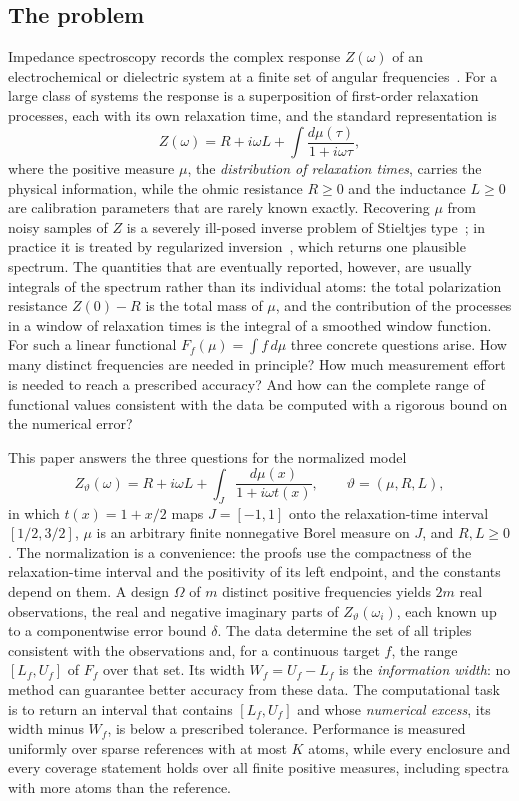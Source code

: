 \documentclass[10pt]{amsart}
\theoremstyle{definition}
\theoremstyle{remark}
\theoremstyle{plain}
\newcommand{\dd}{\,d}
\begin{document}
\subsection{The problem}
Impedance spectroscopy records the complex response $Z(\omega)$ of an electrochemical or dielectric system at a finite set of angular frequencies~\cite{orazem}. For a large class of systems the response is a superposition of first-order relaxation processes, each with its own relaxation time, and the standard representation is
\[
 Z(\omega)=R+i\omega L+\int\frac{d\mu(\tau)}{1+i\omega\tau},
\]
where the positive measure $\mu$, the \emph{distribution of relaxation times}, carries the physical information, while the ohmic resistance $R\ge0$ and the inductance $L\ge0$ are calibration parameters that are rarely known exactly. Recovering $\mu$ from noisy samples of $Z$ is a severely ill-posed inverse problem of Stieltjes type~\cite{grabovsky,browngrabovsky}; in practice it is treated by regularized inversion~\cite{ciucci,wan}, which returns one plausible spectrum. The quantities that are eventually reported, however, are usually integrals of the spectrum rather than its individual atoms: the total polarization resistance $Z(0)-R$ is the total mass of $\mu$, and the contribution of the processes in a window of relaxation times is the integral of a smoothed window function. For such a linear functional $F_f(\mu)=\int f\dd\mu$ three concrete questions arise. How many distinct frequencies are needed in principle? How much measurement effort is needed to reach a prescribed accuracy? And how can the complete range of functional values consistent with the data be computed with a rigorous bound on the numerical error?

This paper answers the three questions for the normalized model
\[
 Z_\vartheta(\omega)=R+i\omega L+\int_J\frac{d\mu(x)}{1+i\omega t(x)},\qquad \vartheta=(\mu,R,L),
\]
in which $t(x)=1+x/2$ maps $J=[-1,1]$ onto the relaxation-time interval $[1/2,3/2]$, $\mu$ is an arbitrary finite nonnegative Borel measure on $J$, and $R,L\ge0$. The normalization is a convenience: the proofs use the compactness of the relaxation-time interval and the positivity of its left endpoint, and the constants depend on them. A design $\Omega$ of $m$ distinct positive frequencies yields $2m$ real observations, the real and negative imaginary parts of $Z_\vartheta(\omega_i)$, each known up to a componentwise error bound $\delta$. The data determine the set of all triples consistent with the observations and, for a continuous target $f$, the range $[L_f,U_f]$ of $F_f$ over that set. Its width $W_f=U_f-L_f$ is the \emph{information width}: no method can guarantee better accuracy from these data. The computational task is to return an interval that contains $[L_f,U_f]$ and whose \emph{numerical excess}, its width minus $W_f$, is below a prescribed tolerance. Performance is measured uniformly over sparse references with at most $K$ atoms, while every enclosure and every coverage statement holds over all finite positive measures, including spectra with more atoms than the reference.
\end{document}
